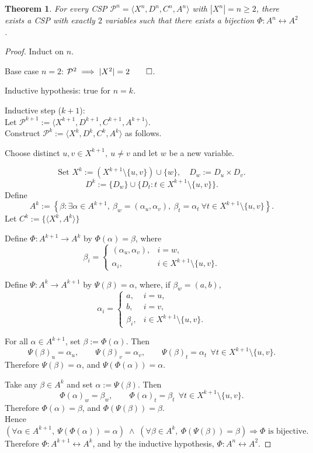 \documentclass[stu,12pt]{apa7}
\newtheorem{theorem}{Theorem}[section]
\theoremstyle{definition}
\begin{document}
\begin{theorem} \label{thm:bijection}
For every CSP $\mathcal{P}^n=\langle X^n,D^n,C^n,A^n\rangle$ with $|X^n|=n\ge2$,
there exists a CSP with exactly $2$ variables such that there exists a bijection $\Phi: A^n \leftrightarrow A^2$.
\end{theorem}
\renewcommand{\qedsymbol}{$\blacksquare$}
\begin{proof}
Induct on $n$.

Base case $n=2$: $\mathcal{P}^2 \implies |X^2|=2 \qed$.
\medskip

Inductive hypothesis: true for $n=k$.
\medskip

Inductive step ($k+1$): 
\medskip
\\ Let
$\mathcal {P}^{k+1}:=\langle X^{k+1},D^{k+1},C^{k+1},A^{k+1}\rangle$. \\ Construct $\mathcal{P}^k:=\langle X^k,D^k,C^k,A^k\rangle$ as follows.

Choose distinct $u,v\in X^{k+1},\ u \neq v$ and let $w$ be a new variable.

\[
\text{Set } X^k := (X^{k+1}\setminus\{u,v\})\cup\{w\},\quad D_w:=D_u\times D_v.
\]
\[
D^k := \{D_w\}\cup\{D_t:t\in X^{k+1}\setminus\{u,v\}\}.
\]
Define
\[
A^k:=\left\{\beta:\exists\alpha\in A^{k+1},\ \beta_w=(\alpha_u,\alpha_v),\
\beta_t=\alpha_t\ \forall t\in X^{k+1}\setminus\{u,v\}\right\}.
\]
Let $C^k:=\{\langle X^k,A^k\rangle\}$

Define $\Phi:A^{k+1}\to A^k$ by $\Phi(\alpha)=\beta$, where
\[
\beta_i=
\begin{cases}
(\alpha_u,\alpha_v), & i=w,\\
\alpha_i, & i\in X^{k+1}\setminus\{u,v\}.
\end{cases}
\]

Define $\Psi:A^k\to A^{k+1}$ by $\Psi(\beta)=\alpha$, where, if $\beta_w=(a,b)$,
\[
\alpha_i=
\begin{cases}
a, & i=u,\\
b, & i=v,\\
\beta_i, & i\in X^{k+1}\setminus\{u,v\}.
\end{cases}
\]

For all $\alpha\in A^{k+1}$, set $\beta:=\Phi(\alpha)$.
Then
\[
\Psi(\beta)_u=\alpha_u,\qquad
\Psi(\beta)_v=\alpha_v,\qquad
\Psi(\beta)_t=\alpha_t\ \ \forall t\in X^{k+1}\setminus\{u,v\}.
\]
Therefore $\Psi(\beta)=\alpha$, and $\Psi(\Phi(\alpha))=\alpha$.

Take any $\beta\in A^k$ and set $\alpha:=\Psi(\beta)$.
Then
\[
\Phi(\alpha)_w=\beta_w,\qquad
\Phi(\alpha)_t=\beta_t\ \ \forall t\in X^{k+1}\setminus\{u,v\}.
\]
Therefore $\Phi(\alpha)=\beta$, and $\Phi(\Psi(\beta))=\beta$.
\\
Hence \((\forall \alpha\in A^{k+1},\ \Psi(\Phi(\alpha))=\alpha) \;
\wedge \;
(\forall \beta\in A^k,\ \Phi(\Psi(\beta))=\beta)
\Rightarrow
\Phi \text{ is bijective}.\)
Therefore $\Phi: A^{k+1} \leftrightarrow A^k$, and by the inductive hypothesis, $\Phi: A^n \leftrightarrow A^2$.
\end{proof}
\end{document}
